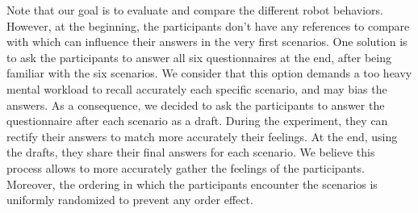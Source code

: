 Note that our goal is to evaluate and compare the different robot behaviors. However, at the beginning, the participants don't have any references to compare with which can influence their answers in the very first scenarios. One solution is to ask the participants to answer all six questionnaires at the end, after being familiar with the six scenarios. We consider that this option demands a too heavy mental workload to recall accurately each specific scenario, and may bias the answers. As a consequence, we decided to ask the participants to answer the questionnaire after each scenario as a draft. During the experiment, they can rectify their answers to match more accurately their feelings. At the end, using the drafts, they share their final answers for each scenario. We believe this process allows to more accurately gather the feelings of the participants. Moreover, the ordering in which the participants encounter the scenarios is uniformly randomized to prevent any order effect. 



